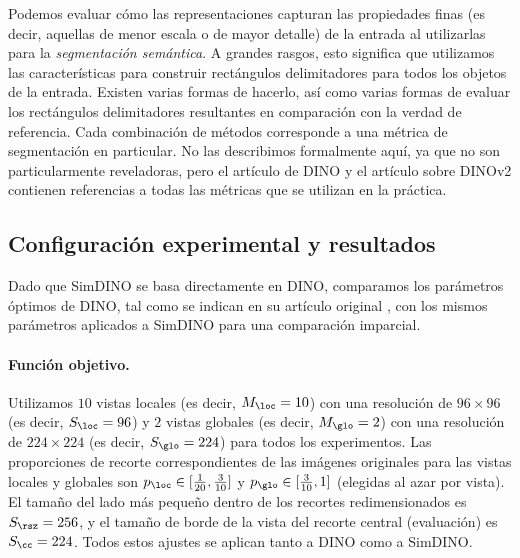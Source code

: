 \documentclass[../../book-main_es.tex]{subfiles}
\begin{document}
Podemos evaluar cómo las representaciones capturan las propiedades finas
(es decir, aquellas de menor escala o de mayor detalle) de la entrada al utilizarlas
para la \textit{segmentación semántica}. A grandes rasgos, esto significa que
utilizamos las características para construir rectángulos delimitadores para todos los objetos de la
entrada. Existen varias formas de hacerlo, así como varias formas de evaluar
los rectángulos delimitadores resultantes en comparación con la verdad de referencia. Cada
combinación de métodos corresponde a una métrica de segmentación en
particular. No las describimos formalmente aquí, ya que no son
particularmente reveladoras, pero el artículo de DINO \citep{caron2021emerging}
y el artículo sobre DINOv2 \citep{oquab2023dinov2} contienen referencias a todas las
métricas que se utilizan en la práctica.

\subsection{Configuración experimental y resultados}
\label{sub:contrastive_learning_experiment_results}

Dado que SimDINO se basa directamente en DINO, comparamos los parámetros óptimos
de DINO, tal como se indican en su artículo original
\citep{caron2021emerging}, con los mismos parámetros aplicados a SimDINO \cite{wu2025simplifying}
para una comparación imparcial.

\paragraph{Función objetivo.} Utilizamos \(10\) vistas locales (es decir,
\(M_{\loc} = 10\)) con una resolución de \(96 \times 96\) (es decir, \(S_{\loc} =
96\)) y \(2\) vistas globales (es decir, \(M_{\glo} = 2\)) con una resolución de
\(224 \times 224\) (es decir, \(S_{\glo} = 224\)) para todos los experimentos.
Las proporciones de recorte correspondientes de las imágenes originales para las vistas locales 
y globales son \(p_{\loc} \in [\frac{1}{20}, \frac{3}{10}]\)
y \(p_{\glo} \in [\frac{3}{10}, 1]\) (elegidas al azar por vista).
El tamaño del lado más pequeño dentro de los recortes redimensionados es \(S_{\rsz} = 256\),
y el tamaño de borde de la vista del recorte central (evaluación) es \(S_{\cc} = 224\).
Todos estos ajustes se aplican tanto a DINO como a SimDINO.
\end{document}
